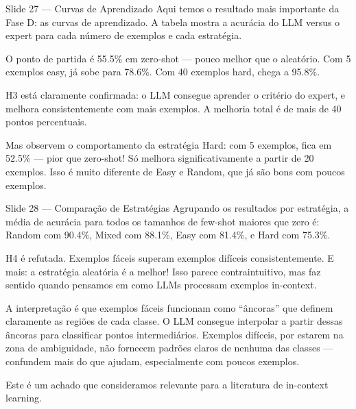 \documentclass[aspectratio=169,11pt]{beamer}
\begin{document}
\begin{frame}{Slide 27 --- Curvas de Aprendizado}
\small
Aqui temos o resultado mais importante da Fase D: as curvas de aprendizado. A tabela mostra a acurácia do LLM versus o expert para cada número de exemplos e cada estratégia.

O ponto de partida é 55.5\% em zero-shot --- pouco melhor que o aleatório. Com 5 exemplos easy, já sobe para 78.6\%. Com 40 exemplos hard, chega a 95.8\%.

H3 está claramente confirmada: o LLM consegue aprender o critério do expert, e melhora consistentemente com mais exemplos. A melhoria total é de mais de 40 pontos percentuais.

Mas observem o comportamento da estratégia Hard: com 5 exemplos, fica em 52.5\% --- pior que zero-shot! Só melhora significativamente a partir de 20 exemplos. Isso é muito diferente de Easy e Random, que já são bons com poucos exemplos.
\end{frame}

\begin{frame}{Slide 28 --- Comparação de Estratégias}
\small
Agrupando os resultados por estratégia, a média de acurácia para todos os tamanhos de few-shot maiores que zero é: Random com 90.4\%, Mixed com 88.1\%, Easy com 81.4\%, e Hard com 75.3\%.

H4 é refutada. Exemplos fáceis superam exemplos difíceis consistentemente. E mais: a estratégia aleatória é a melhor! Isso parece contraintuitivo, mas faz sentido quando pensamos em como LLMs processam exemplos in-context.

A interpretação é que exemplos fáceis funcionam como ``âncoras'' que definem claramente as regiões de cada classe. O LLM consegue interpolar a partir dessas âncoras para classificar pontos intermediários. Exemplos difíceis, por estarem na zona de ambiguidade, não fornecem padrões claros de nenhuma das classes --- confundem mais do que ajudam, especialmente com poucos exemplos.

Este é um achado que consideramos relevante para a literatura de in-context learning.
\end{frame}
\end{document}
